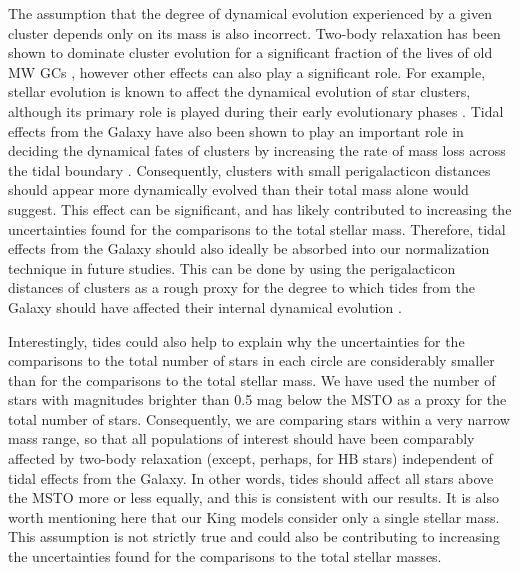 The assumption that the degree of dynamical evolution experienced by a
given cluster depends only on its mass is also incorrect.  Two-body 
relaxation has been shown to dominate cluster evolution for a
significant fraction of the lives of old MW GCs
\citep[e.g.][]{gieles11}, however other effects can also play a
significant role.  For example, stellar evolution is known to affect
the dynamical evolution of star 
clusters, although its primary role is played during their early
evolutionary phases 
\citep[e.g.][]{applegate86, chernoff90, fukushige95}.  Tidal effects
from the Galaxy have also been shown to play an important role in
deciding the dynamical fates of clusters by increasing the rate of
mass loss across the 
tidal boundary \citep[e.g.][]{heggie03}.  Consequently, clusters with
small perigalacticon distances should appear more dynamically evolved
than their total mass alone would suggest.  This effect can 
be significant, and has likely contributed to increasing the uncertainties
found for the comparisons to the total stellar mass.  Therefore, tidal
effects from the Galaxy should also ideally 
be absorbed into our normalization technique in future studies.  This
can be done by using the perigalacticon distances of clusters as a
rough proxy for the degree to which tides from the Galaxy should have
affected their internal dynamical evolution \citep{gieles11}.  

Interestingly, tides could also
help to explain why the uncertainties for the comparisons to the total
number of stars in each circle are considerably smaller than for the
comparisons to the total stellar mass.  We have used 
the number of stars with magnitudes brighter than 0.5 mag below the
MSTO as a proxy for the total number of stars.  Consequently, we are
comparing stars within a very narrow mass range, so that all 
populations of interest should have been comparably affected by
two-body relaxation (except, perhaps, for HB stars) independent of
tidal effects from 
the Galaxy.  In other words, tides should affect all stars above the
MSTO more or less equally, and this is consistent with our results.
It is also worth mentioning here that our King models consider only a
single stellar 
mass.  This assumption is not strictly true and could also be
contributing to increasing the uncertainties found for the comparisons
to the total stellar masses.

